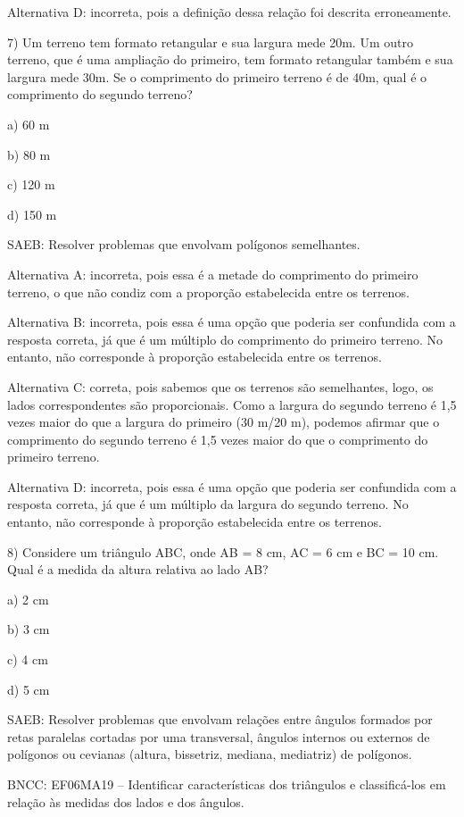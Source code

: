 Alternativa D: incorreta, pois a definição dessa relação foi descrita
erroneamente.

7) Um terreno tem formato retangular e sua largura mede 20m. Um outro
terreno, que é uma ampliação do primeiro, tem formato retangular também
e sua largura mede 30m. Se o comprimento do primeiro terreno é de 40m,
qual é o comprimento do segundo terreno?

a) 60 m

b) 80 m

c) 120 m

d) 150 m

SAEB: Resolver problemas que envolvam polígonos semelhantes.

Alternativa A: incorreta, pois essa é a metade do comprimento do
primeiro terreno, o que não condiz com a proporção estabelecida entre os
terrenos.

Alternativa B: incorreta, pois essa é uma opção que poderia ser
confundida com a resposta correta, já que é um múltiplo do comprimento
do primeiro terreno. No entanto, não corresponde à proporção
estabelecida entre os terrenos.

Alternativa C: correta, pois sabemos que os terrenos são semelhantes,
logo, os lados correspondentes são proporcionais. Como a largura do
segundo terreno é 1,5 vezes maior do que a largura do primeiro (30 m/20
m), podemos afirmar que o comprimento do segundo terreno é 1,5 vezes
maior do que o comprimento do primeiro terreno.

Alternativa D: incorreta, pois essa é uma opção que poderia ser
confundida com a resposta correta, já que é um múltiplo da largura do
segundo terreno. No entanto, não corresponde à proporção estabelecida
entre os terrenos.

8) Considere um triângulo ABC, onde AB = 8 cm, AC = 6 cm e BC = 10 cm.
Qual é a medida da altura relativa ao lado AB?

a) 2 cm

b) 3 cm

c) 4 cm

d) 5 cm

SAEB: Resolver problemas que envolvam relações entre ângulos formados
por retas paralelas cortadas por uma transversal, ângulos internos ou
externos de polígonos ou cevianas (altura, bissetriz, mediana,
mediatriz) de polígonos.

BNCC: EF06MA19 -- Identificar características dos triângulos e
classificá-los em relação às medidas dos lados e dos ângulos.

